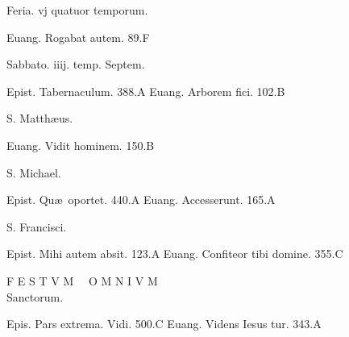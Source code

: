 \documentclass[a5paper,10pt]{book}
\def\ae{æ}
\begin{document}
\begin{multicols}{2}
\begin{center}
\color{red} Feria. vj quatuor temporum.
\end{center}
\vspace{-.75em}
\par \noindent Euang. Rogabat autem. \hfill 89.F
\newline \vspace{-1.75em}
\begin{center}
\color{red} Sabbato. iiij. temp. Septem.
\end{center}
\vspace{-.75em}
\par \noindent Epist. Tabernaculum. \hfill 388.A
\newline Euang. Arborem fici. \hfill 102.B
\newline \vspace{-1.75em}
\begin{center}
\color{red} S. Matth\ae us.
\end{center}
\vspace{-.75em}
\par \noindent Euang. Vidit hominem. \hfill 150.B
\newline \vspace{-1.75em}
\begin{center}
\color{red} S. Michael.
\end{center}
\vspace{-.75em}
\par \noindent Epist. Qu\ae \ oportet. \hfill 440.A
\newline Euang. Accesserunt. \hfill 165.A
\newline \vspace{-1.75em}
\begin{center}
\color{red} S. Francisci.
\end{center}
\vspace{-.75em}
\par \noindent Epist. Mihi autem absit. \hfill 123.A
\newline Euang. Confiteor tibi domine. \hfill 355.C
\newline \vspace{-1.75em}
\begin{center}
\color{red} \large F E S T V M \ \ O M N I V M\\
\normalsize Sanctorum.
\end{center}
\vspace{-.75em}
\par \noindent Epis. Pars extrema. Vidi. \hfill 500.C
\newline Euang. Videns Iesus tur. \hfill 343.A

\end{multicols}
\end{document}
